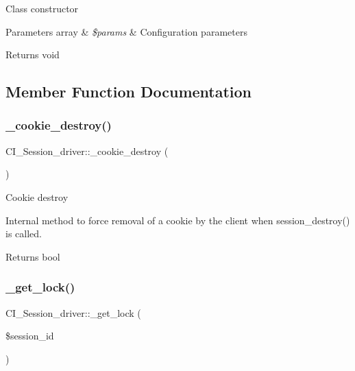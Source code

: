 Class constructor


\begin{DoxyParams}[1]{Parameters}
array & {\em \$params} & Configuration parameters \\
\hline
\end{DoxyParams}
\begin{DoxyReturn}{Returns}
void 
\end{DoxyReturn}


\subsection{Member Function Documentation}
\mbox{\label{class_c_i___session__driver_ae5e9ee5230b7c36a93591df8192169ce}} 
\subsubsection{\texorpdfstring{\+\_\+cookie\+\_\+destroy()}{\_cookie\_destroy()}}
{\footnotesize\ttfamily C\+I\+\_\+\+Session\+\_\+driver\+::\+\_\+cookie\+\_\+destroy (\begin{DoxyParamCaption}{ }\end{DoxyParamCaption})\hspace{0.3cm}{\ttfamily [protected]}}

Cookie destroy

Internal method to force removal of a cookie by the client when session\+\_\+destroy() is called.

\begin{DoxyReturn}{Returns}
bool 
\end{DoxyReturn}
\mbox{\label{class_c_i___session__driver_a18248b58343fd8e63a9538fc7d478a49}} 
\subsubsection{\texorpdfstring{\+\_\+get\+\_\+lock()}{\_get\_lock()}}
{\footnotesize\ttfamily C\+I\+\_\+\+Session\+\_\+driver\+::\+\_\+get\+\_\+lock (\begin{DoxyParamCaption}\item[{}]{\$session\+\_\+id }\end{DoxyParamCaption})\hspace{0.3cm}{\ttfamily [protected]}}

